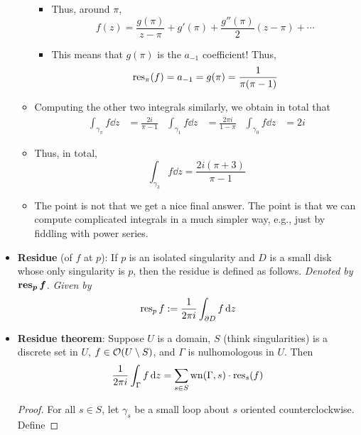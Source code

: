 \documentclass[../notes.tex]{subfiles}
\begin{document}
\begin{itemize}
\begin{itemize}
\begin{itemize}
            \item Thus, around $\pi$,
            \begin{equation*}
                f(z) = \frac{g(\pi)}{z-\pi}+g'(\pi)+\frac{g''(\pi)}{2}(z-\pi)+\cdots
            \end{equation*}
            \item This means that $g(\pi)$ is the $a_{-1}$ coefficient! Thus,
            \begin{equation*}
                \operatorname{res}_\pi(f) = a_{-1} = g(\pi) = \frac{1}{\pi(\pi-1)}
            \end{equation*}
        \end{itemize}
        \item Computing the other two integrals similarly, we obtain in total that
        \begin{align*}
            \int_{\gamma_\pi}f\dd{z} &= \frac{2i}{\pi-1}&
            \int_{\gamma_1}f\dd{z} &= \frac{2\pi i}{1-\pi}&
            \int_{\gamma_0}f\dd{z} &= 2i
        \end{align*}
        \item Thus, in total,
        \begin{equation*}
            \int_{\gamma_3}f\dd{z} = \frac{2i(\pi+3)}{\pi-1}
        \end{equation*}
        \item The point is not that we get a nice final answer. The point is that we can compute complicated integrals in a much simpler way, e.g., just by fiddling with power series.
    \end{itemize}
    \item \textbf{Residue} (of $f$ at $p$): If $p$ is an isolated singularity and $D$ is a small disk whose only singularity is $p$, then the residue is defined as follows. \emph{Denoted by} $\bm{\res_pf}$. \emph{Given by}
    \begin{equation*}
        \operatorname{res}_pf := \frac{1}{2\pi i}\int_{\partial D}f\dd{z}
    \end{equation*}
    \item \textbf{Residue theorem}: Suppose $U$ is a domain, $S$ (think singularities) is a discrete set in $U$, $f\in\mathcal{O}(U\setminus S)$, and $\Gamma$ is nulhomologous in $U$. Then
    \begin{equation*}
        \frac{1}{2\pi i}\int_\Gamma f\dd{z} = \sum_{s\in S}\operatorname{wn}(\Gamma,s)\cdot\operatorname{res}_s(f)
    \end{equation*}
    \begin{proof}
        For all $s\in S$, let $\gamma_s$ be a small loop about $s$ oriented counterclockwise. Define

\end{proof}
\end{itemize}
\end{document}
